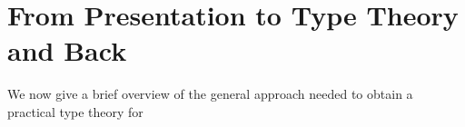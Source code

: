 \documentclass[pra,floatfix,
amsmath,superscriptaddress, 12pt]{article}
\theoremstyle{definition}
\newtheorem*{lem*}{Lemma}
\newcommand{\mc}[1]{\mathcal{#1}}
\begin{document}














\section{From Presentation to Type Theory and Back}


We now give a brief overview of the general approach needed to obtain a practical type theory for 
\end{document}
